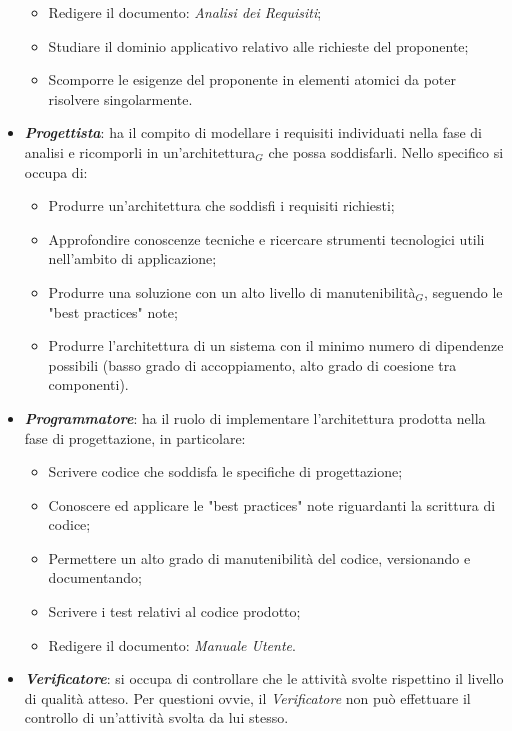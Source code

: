 \begin{itemize}
  \begin{itemize}
    \item Redigere il documento: \textit{Analisi dei Requisiti};
    \item Studiare il dominio applicativo relativo alle richieste del proponente;
    \item Scomporre le esigenze del proponente in elementi atomici da poter risolvere singolarmente.
  \end{itemize}
  \item \textbf{\textit{Progettista}}: ha il compito di modellare i requisiti individuati nella fase di analisi e ricomporli in un'architettura$_G$ che possa soddisfarli. Nello specifico si occupa di:
  \begin{itemize}
    \item Produrre un'architettura che soddisfi i requisiti richiesti;
    \item Approfondire conoscenze tecniche e ricercare strumenti tecnologici utili nell'ambito di applicazione;
    \item Produrre una soluzione con un alto livello di manutenibilità$_G$, seguendo le "best practices" note;
    \item Produrre l'architettura di un sistema con il minimo numero di dipendenze possibili (basso grado di accoppiamento, alto grado di coesione tra componenti).
  \end{itemize}
  \item \textbf{\textit{Programmatore}}: ha il ruolo di implementare l'architettura prodotta nella fase di progettazione, in particolare:
  \begin{itemize}
    \item Scrivere codice che soddisfa le specifiche di progettazione;
    \item Conoscere ed applicare le "best practices" note riguardanti la scrittura di codice;
    \item Permettere un alto grado di manutenibilità del codice, versionando e documentando;
    \item Scrivere i test relativi al codice prodotto;
    \item Redigere il documento: \textit{Manuale Utente}.
  \end{itemize}
  \item \textbf{\textit{Verificatore}}: si occupa di controllare che le attività svolte rispettino il livello di qualità atteso. Per questioni ovvie, il \textit{Verificatore} non può effettuare il controllo di un'attività svolta da lui stesso.
\end{itemize}

